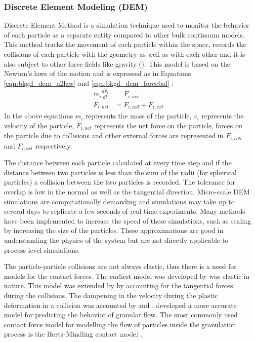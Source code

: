 \documentclass[preprint,11pt,authoryear]{elsarticle}
\begin{document}
\subsubsection{Discrete Element Modeling (DEM)}
 Discrete Element Method is a simulation technique used to monitor the behavior of each particle 
as a separate entity compared to other bulk continuum models. This method tracks the movement of 
each particle within the space, records the collisions of each particle with the geometry as well 
as with each other and it is also subject to other force fields like gravity (\cite{Barrasso2015cerd}). This 
model is based on the Newton's laws of the motion and is expressed as in Equations 
\ref{eqn:bkgd_dem_n2law} and  \ref{eqn:bkgd_dem_forcebal} : \\
\begin{align}
m_i\frac{dv_i}{dt} &= F_{i,net} \label{eqn:bkgd_dem_n2law} \\
F_{i,net} &=  F_{i,coll} +  F_{i,ext} \label{eqn:bkgd_dem_forcebal}
\end{align}
In the above equations $m_i$ represents the mass of the particle, $v_i$ represents the velocity of 
the particle, $F_{i,net}$  represents the net force on the particle, forces on the particle due to collisions 
and other external forces are represented in $F_{i,coll}$ and $F_{i,ext}$ respectively.

The distance between each particle calculated at every time step and if the distance between two 
particles is less than the sum of the radii (for spherical particles)  a collision between the two particles 
is recorded. The tolerance for overlap is low in the normal as well as the tangential direction. 
Micro-scale DEM simulations are computationally demanding and simulations may take up to several 
days to replicate a few seconds of real time experiments. Many methods have been implemented to 
increase the speed of these simulations, such as scaling by increasing the size of the particles. These 
approximations are good in understanding the physics of the system but are not directly applicable to 
process-level simulations. 

The particle-particle collisions are not always elastic, thus there is a need for models for the 
contact forces. The earliest model was developed by \cite{hertz1882} was elastic in nature. This model was 
extended by \cite{mindlin1953} by accounting for the  tangential forces during the collisions. The dampening
in the velocity during the plastic deformation in a collision was accounted by \cite{Cundall1979} and 
\cite{walton1986}. \cite{tsuji1992} developed a more accurate model for predicting the behavior of granular flow.
The most commonly used contact force model for modelling the flow of particles inside the granulation process 
is the Hertz-Mindling contact model \citep{gantt2006}\citep{hassanpour2013}. 
 
\end{document}
